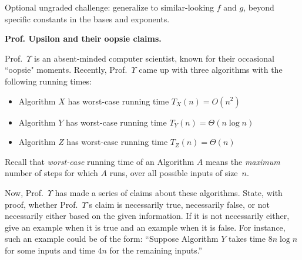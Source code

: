 \documentclass[11pt,addpoints,answers]{exam}
\begin{document}
\begin{questions}
\begin{parts}
    Optional ungraded challenge: generalize to similar-looking $f$ and $g$, beyond specific constants in the bases and exponents.

    \begin{solution}
    \end{solution}

  \end{parts}


 
  \question \textbf{Prof. Upsilon and their oopsie claims.}

  
  Prof.~$\Upsilon$ is an absent-minded computer scientist, known for their occasional ``oopsie" moments. Recently, Prof.~$\Upsilon$ came up with three algorithms with the following running times:  

  \begin{itemize}
      \item Algorithm $X$ has worst-case running time $T_{X}(n) = O(n^2)$
      \item Algorithm $Y$ has worst-case running time $T_{Y}(n) = \Theta(n \log n)$
      \item Algorithm $Z$ has worst-case running time $T_{Z}(n) = \Theta(n)$
  \end{itemize}

  Recall that \emph{worst-case} running time of an Algorithm $A$ means the \emph{maximum} number of steps for which $A$ runs, over all possible inputs of size~$n$. %

  Now, Prof.~$\Upsilon$ has made a series of claims about these algorithms.  State, with proof, whether Prof.~$\Upsilon$'s claim is necessarily true, necessarily false, or not necessarily either based on the given information. If it is not necessarily either, give an example when it is true and an example when it is false. For instance, such an example could be of the form: ``Suppose Algorithm $Y$ takes time $8n\log n$ for some inputs and time $4n$ for the remaining inputs.''
  
  \begin{solution}
  \end{solution}


\end{questions}
\end{document}
